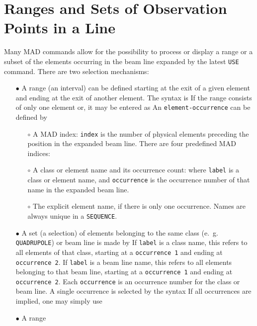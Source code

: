 \section{Ranges and Sets of Observation Points in a Line}
\label{S-OBSAT}
Many MAD commands allow for the possibility to process or display
a range or a subset of the elements occurring in the beam line expanded
by the latest {\tt USE} command.
There are two selection mechanisms:
\begin{itemize}
\item[\(\bullet\)]
A range (an interval) can be defined starting at the exit of a given element
and ending at the exit of another element.
The syntax is
If the range consists of only one element or,
it may be entered as
An {\tt element-occurrence} can be defined by
\begin{itemize}
\item[\(\circ\)] A MAD index:
{\tt index} is the number of physical elements preceding the position
in the expanded beam line.
There are four predefined MAD indices:
\item[\(\circ\)] A class or element name and its occurrence count:
where {\tt label} is a class or element name,
and {\tt occurrence} is the occurrence number of that name in the
expanded beam line.
\item[\(\circ\)] The explicit element name, if there is only one occurrence.
Names are always unique in a {\tt SEQUENCE}.
\end{itemize}
 
\item[\(\bullet\)] A set (a selection) of elements belonging to
the same class (e.~g. {\tt QUADRUPOLE}) or beam line is made by
If {\tt label} is a class name,
this refers to all elements of that class,
starting at a {\tt occurrence 1} and ending at {\tt occurrence 2}.
If {\tt label} is a beam line name,
this refers to all elements belonging to that beam line,
starting at a {\tt occurrence 1} and ending at {\tt occurrence 2}.
Each {\tt occurrence} is an occurrence number for the class or beam line.
A single occurrence is selected by the syntax
If all occurrences are implied, one may simply use
 
\item[\(\bullet\)]
A range
\end{itemize}
